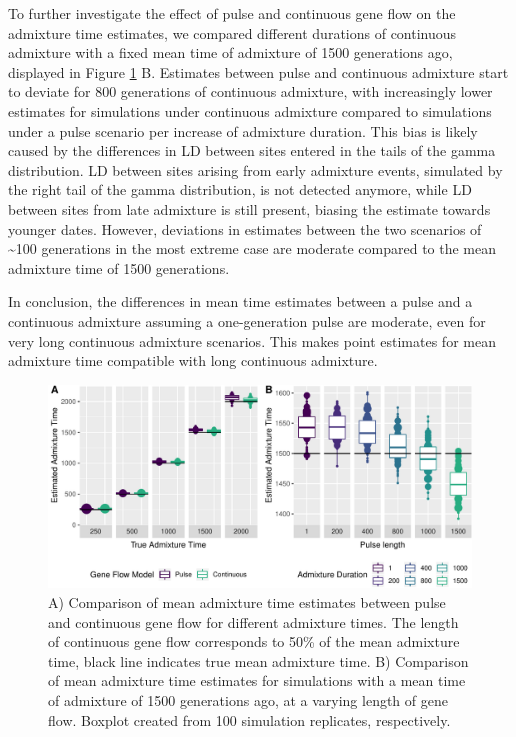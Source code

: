 \documentclass[]{article}
\begin{document}
To
further investigate the effect of pulse and continuous gene flow on the
admixture time estimates, we compared different durations of continuous
admixture with a fixed mean time of admixture of 1500
generations ago, displayed in Figure \ref{fig:fig2} B. Estimates between
pulse and continuous admixture start to deviate for 800 generations of
continuous admixture, with increasingly lower estimates for simulations
under continuous admixture compared to simulations under a pulse scenario per increase of admixture duration. This bias is likely caused
by the differences in LD between sites entered in the tails of the gamma
distribution. LD between sites arising from early admixture events,
simulated by the right tail of the gamma distribution, is not detected
anymore, while LD between sites from late admixture is still present,
biasing the estimate towards younger dates. However, deviations in
estimates between the two scenarios of \textasciitilde{}100 generations
in the most extreme case are moderate compared to the mean admixture
time of 1500 generations.

In conclusion, the differences in mean time estimates between a pulse and a continuous admixture assuming a one-generation pulse are moderate, even for very long continuous admixture scenarios. This makes point estimates for mean admixture time compatible with long continuous admixture.


\begin{figure}
\centering
\includegraphics{Admixture_Time_Inference_Paper_Draft_files/figure-latex/fig2-1.pdf}
\caption{\label{fig:fig2} A) Comparison of mean admixture time estimates
between pulse and continuous gene flow for different admixture times.
The length of continuous gene flow corresponds to 50\% of the mean
admixture time, black line indicates true mean admixture time. B)
Comparison of mean admixture time estimates for simulations with a mean
time of admixture of 1500 generations ago, at a varying length of gene
flow. Boxplot created from 100 simulation replicates, respectively.}
\end{figure}
\end{document}

